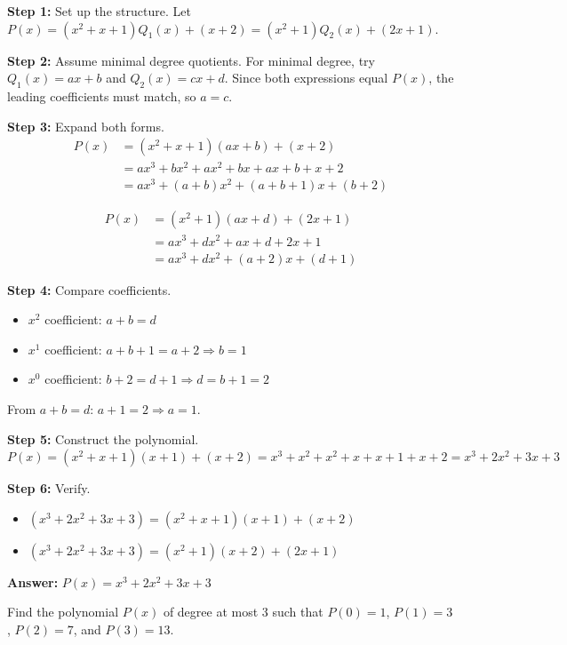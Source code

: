 \documentclass[12pt]{article}
\newenvironment{problem}[1]
{\begin{tcolorbox}[colback=blue!5!white,colframe=blue!75!black,title={#1}]}{\end{tcolorbox}}
\newenvironment{solution}
{\begin{tcolorbox}[colback=green!5!white,colframe=green!75!black,title={Solution}]}{\end{tcolorbox}}
\begin{document}
\begin{solution}
\textbf{Step 1:} Set up the structure.
Let $P(x) = (x^2+x+1)Q_1(x) + (x+2) = (x^2+1)Q_2(x) + (2x+1)$.

\textbf{Step 2:} Assume minimal degree quotients.
For minimal degree, try $Q_1(x) = ax+b$ and $Q_2(x) = cx+d$. Since both expressions equal $P(x)$, the leading coefficients must match, so $a = c$.

\textbf{Step 3:} Expand both forms.
\begin{align}
P(x) &= (x^2+x+1)(ax+b) + (x+2)\\
     &= ax^3 + bx^2 + ax^2 + bx + ax + b + x + 2\\
     &= ax^3 + (a+b)x^2 + (a+b+1)x + (b+2)
\end{align}

\begin{align}
P(x) &= (x^2+1)(ax+d) + (2x+1)\\
     &= ax^3 + dx^2 + ax + d + 2x + 1\\
     &= ax^3 + dx^2 + (a+2)x + (d+1)
\end{align}

\textbf{Step 4:} Compare coefficients.
\begin{itemize}
    \item $x^2$ coefficient: $a+b = d$
    \item $x^1$ coefficient: $a+b+1 = a+2 \Rightarrow b = 1$
    \item $x^0$ coefficient: $b+2 = d+1 \Rightarrow d = b+1 = 2$
\end{itemize}

From $a+b = d$: $a+1 = 2 \Rightarrow a = 1$.

\textbf{Step 5:} Construct the polynomial.
$P(x) = (x^2+x+1)(x+1) + (x+2) = x^3 + x^2 + x^2 + x + x + 1 + x + 2 = x^3 + 2x^2 + 3x + 3$

\textbf{Step 6:} Verify.
\begin{itemize}
    \item $(x^3+2x^2+3x+3) = (x^2+x+1)(x+1) + (x+2)$ \checkmark
    \item $(x^3+2x^2+3x+3) = (x^2+1)(x+2) + (2x+1)$ \checkmark
\end{itemize}

\textbf{Answer:} $P(x) = x^3+2x^2+3x+3$
\end{solution}

\begin{problem}{Example: Polynomial with Fixed Values}
Find the polynomial $P(x)$ of degree at most 3 such that $P(0) = 1$, $P(1) = 3$, $P(2) = 7$, and $P(3) = 13$.
\end{problem}
\end{document}
